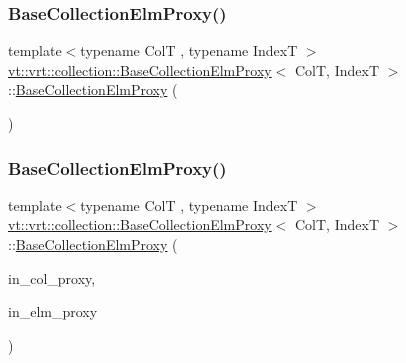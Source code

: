 \subsubsection{\texorpdfstring{Base\+Collection\+Elm\+Proxy()}{BaseCollectionElmProxy()}\hspace{0.1cm}{\footnotesize\ttfamily [1/2]}}
{\footnotesize\ttfamily template$<$typename ColT , typename IndexT $>$ \\
\hyperlink{structvt_1_1vrt_1_1collection_1_1_base_collection_elm_proxy}{vt\+::vrt\+::collection\+::\+Base\+Collection\+Elm\+Proxy}$<$ ColT, IndexT $>$\+::\hyperlink{structvt_1_1vrt_1_1collection_1_1_base_collection_elm_proxy}{Base\+Collection\+Elm\+Proxy} (\begin{DoxyParamCaption}{ }\end{DoxyParamCaption})\hspace{0.3cm}{\ttfamily [default]}}

\mbox{\label{structvt_1_1vrt_1_1collection_1_1_base_collection_elm_proxy_a3b6fc7db3f5e10838e11615570ec067f}} 
\subsubsection{\texorpdfstring{Base\+Collection\+Elm\+Proxy()}{BaseCollectionElmProxy()}\hspace{0.1cm}{\footnotesize\ttfamily [2/2]}}
{\footnotesize\ttfamily template$<$typename ColT , typename IndexT $>$ \\
\hyperlink{structvt_1_1vrt_1_1collection_1_1_base_collection_elm_proxy}{vt\+::vrt\+::collection\+::\+Base\+Collection\+Elm\+Proxy}$<$ ColT, IndexT $>$\+::\hyperlink{structvt_1_1vrt_1_1collection_1_1_base_collection_elm_proxy}{Base\+Collection\+Elm\+Proxy} (\begin{DoxyParamCaption}\item[{\hyperlink{structvt_1_1vrt_1_1collection_1_1_base_collection_elm_proxy_af80f1576659b626a30828c6d85eca926}{Proxy\+Type} const \&}]{in\+\_\+col\+\_\+proxy,  }\item[{\hyperlink{structvt_1_1vrt_1_1collection_1_1_base_collection_elm_proxy_a0f37a49c04c28fdc6ea8665aefc2f40c}{Element\+Proxy\+Type} const \&}]{in\+\_\+elm\+\_\+proxy }\end{DoxyParamCaption})}




